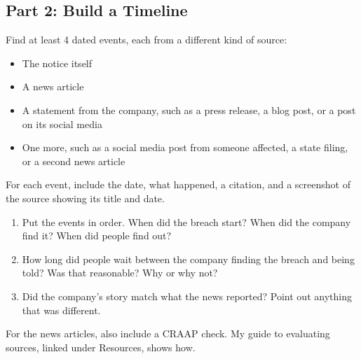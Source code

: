 \documentclass[12pt]{article}
\begin{document}
\subsection*{Part 2: Build a Timeline}
Find at least 4 dated events, each from a different kind of source:
\begin{itemize}
    \item The notice itself
    \item A news article
    \item A statement from the company, such as a press release, a blog post, or a post on its social media
    \item One more, such as a social media post from someone affected, a state filing, or a second news article
\end{itemize}
For each event, include the date, what happened, a citation, and a screenshot of the source showing its title and date.
\begin{enumerate}[start=3]
    \item Put the events in order. When did the breach start? When did the company find it? When did people find out?
    \item How long did people wait between the company finding the breach and being told? Was that reasonable? Why or why not?
    \item Did the company's story match what the news reported? Point out anything that was different.
\end{enumerate}
For the news articles, also include a CRAAP check. My guide to evaluating sources, linked under Resources, shows how.
\end{document}
